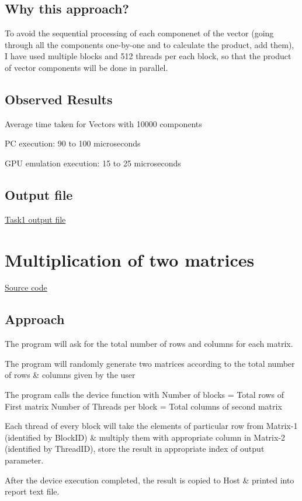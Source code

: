 \documentclass[]{article}
\begin{document}
    \subsection{Why this approach?}
    
    To avoid the sequential processing of each componenet of the vector (going through all the components one-by-one and to calculate the product, add them), I have used multiple blocks and 512 threads per each block, so that the product of vector components will be done in parallel.
    
    \subsection{Observed Results}
    
    Average time taken for Vectors with 10000 components
    
    \begin{list}{*}{}
     	\item PC execution:  90 to 100 microseconds
    	\item GPU emulation execution: 15 to 25 microseconds
    \end{list} 
   
   \subsection{Output file}
   
	\href{./Task1_data.txt}{Task1 output file}
    
 \newpage
 \section{Multiplication of two matrices}
 
 \href{./MatrixMultiply.cu}{Source code}
 
 \subsection{Approach}
 
	 \begin{list}{*}{}
 	\item The program will ask for the total number of rows and columns for each matrix.
 	\item The program will randomly generate two matrices according to the total number of rows \& columns given by the user
 	\item The program calls the device function with \newline 
 	Number of blocks = Total rows of First matrix \newline
 	Number of Threads per block = Total columns of second matrix 	
 	\item Each thread of every block will take the elements of particular row from Matrix-1 (identified by BlockID) \& multiply them with appropriate column in Matrix-2 (identified by ThreadID), store the result in appropriate index of output parameter.
 	\item After the device execution completed, the result is copied to Host \& printed into report text file.
 	
	 \end{list}
 
\end{document}
